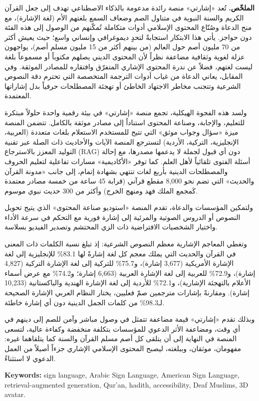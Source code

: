 \begin{Arabic}
\noindent\textbf{الملخّص.}
تُعد «إشارتي» منصة رائدة مدعومة بالذكاء الاصطناعي تهدف إلى جعل القرآن الكريم والسنة النبوية في متناول الصم وضعاف
السمع بلغتهم الأم (لغة الإشارة)، مع منح الدعاة وصُنّاع المحتوى الإسلامي أدوات متكاملة تُمكّنهم من الوصول إلى هذه
الفئة دون حواجز. يأتي هذا الابتكار استجابةً لتحدٍ ديموغرافي وإنساني واسع؛ حيث يعيش أكثر من 70 مليون أصم حول العالم
(من بينهم أكثر من 15 مليون مسلم أصم)، يواجهون عزلة لغوية وثقافية مضاعفة نظراً لأن المحتوى الديني يصلهم مكتوباً أو
مسموعاً بلغة ليست لغتهم، فضلاً عن ندرة المحتوى الإشاري المتفرّق وافتقاره للمصادر الموثقة. وفي المقابل، يعاني الدعاة
من غياب أدوات الترجمة المتخصصة التي تحترم دقة النصوص الشرعية وتتجنب مخاطر الاجتهاد الخاطئ أو تهجئة المصطلحات حرفياً
بدل إشاراتها المعتمدة.

ولسد هذه الفجوة الهيكلية، تجمع منصة «إشارتي» في بيئة رقمية واحدة حلولاً مبتكرة للتعليم، والإجابة، وصناعة المحتوى
استناداً إلى مصادر موثقة بالكامل. تتضمن المنصة ميزة «سؤال وجواب موثق» التي تتيح للمستخدم الاستعلام بلغات متعددة
(العربية، الإنجليزية، التركية، الأردية) لتسترجع المنصة الآيات والأحاديث ذات الصلة عبر تقنية التوليد المعزز
بالاسترجاع (RAG) دون أي قبول لجملة لا يدعمها مصدرها، مع إحالة أسئلة الفتوى تلقائياً لأهل العلم. كما توفر «الأكاديمية»
مسارات تفاعلية لتعليم الحروف والمصطلحات الدينية بأربع لغات تنتهي بشهادة إتمام، إلى جانب «مدونة القرآن والحديث» التي
تضم نحو 8,000 مقطع قرآني (قرابة 45 ساعة من خمسة مصادر معتمدة كَمجمع الملك فهد ومنهج الخرج) وأكثر من 300 حديث نبوي
موسوم.

ولتمكين المؤسسات والدعاة، تقدم المنصة «استوديو صناعة المحتوى» الذي يتيح تحويل النصوص أو الدروس الصوتية والمرئية إلى
إشارة فورية مع التحكم في سرعة الأداء واختيار الشخصيات الافتراضية ذات الزي المحتشم وتصدير الفيديو بسلاسة.

وتغطي المعاجم الإشارية معظم النصوص الشرعية: إذ تبلغ نسبة الكلمات ذات المعنى في القرآن والحديث التي يملك معجم كل لغة
إشارةً لها \textenglish{83.1\%} للإنجليزية إلى لغة الإشارة الأمريكية (3,677 إشارة)، و\textenglish{75.7\%} للتركية إلى لغة الإشارة التركية (4,827
إشارة)، و\textenglish{72.9\%} للعربية إلى لغة الإشارة العربية (6,663 إشارة؛ و\textenglish{74.2\%} مع عرض أسماء الأعلام بالتهجئة الإشارية)، و\textenglish{72.1\%}
للأردية إلى لغة الإشارة الهندية والباكستانية (10,233 إشارة). ومقارنةً بإشارات مترجمين صمّ فعليين، يختار النظام
العربي الإشارة الصحيحة لـ\textenglish{98.3\%} من كلمات الجمل الدينية دون أي إشارة خاطئة.

وبذلك تقدم «إشارتي» قيمة مضاعفة تتمثل في وصول مباشر وآمن للصم إلى دينهم في أي وقت، ومضاعفة الأثر الدعوي للمؤسسات
بتكلفة منخفضة وكفاءة عالية، لتسعى المنصة في النهاية إلى أن يتلقى كل أصم مسلم القرآن والسنة كما يتلقاهما غيره:
مفهومان، موثقان، وببلغته، ليصبح المحتوى الإسلامي الإشاري جزءاً أصيلاً من العمل الدعوي لا استثناءً.
\end{Arabic}

\noindent\textbf{Keywords:} sign language, Arabic Sign Language, American Sign Language, retrieval-augmented generation,
Qur'an, hadith, accessibility, Deaf Muslims, 3D avatar.
